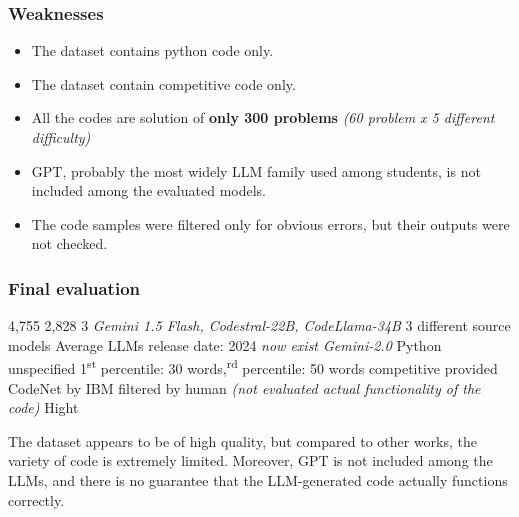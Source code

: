 \subsubsection*{Weaknesses}
\begin{itemize}
    \item The dataset contains python code only.
    \item The dataset contain competitive code only.
    \item All the codes are solution of \textbf{only 300 problems} 
    \textit{(60 problem x 5 different difficulty)}
    \item GPT, probably the most widely LLM family 
    used among students, is not 
    included among the evaluated models.
    \item The code samples were filtered only for obvious errors, 
    but their outputs were not checked.
\end{itemize}


\subsubsection*{Final evaluation}


\expandafter\def\csname AIGCodeSetHumanCode\endcsname{4,755}
\expandafter\def\csname AIGCodeSetLLMCode\endcsname{2,828}
\expandafter\def\csname AIGCodeSetNumLLMs\endcsname{3 \textit{Gemini 1.5 Flash, Codestral-22B, CodeLlama-34B}}
\expandafter\def\csname AIGCodeSetLLMDiversity\endcsname{3 different source models}
\expandafter\def\csname AIGCodeSetCurrentUse\endcsname{Average LLMs release date: 2024 \textit{now exist Gemini-2.0}}
\expandafter\def\csname AIGCodeSetLanguages\endcsname{Python}
\expandafter\def\csname AIGCodeSetCodeTypes\endcsname{unspecified}
\expandafter\def\csname AIGCodeSetCodeSize\endcsname{1\textsuperscript{st} percentile: 30 words,\textsuperscript{rd} percentile: 50 words}
\expandafter\def\csname AIGCodeSetCodeContext\endcsname{competitive}
\expandafter\def\csname AIGCodeSetPrompts\endcsname{provided}
\expandafter\def\csname AIGCodeSetSources\endcsname{CodeNet by IBM \cite{puri2021codenet}}
\expandafter\def\csname AIGCodeSetCodeQuality\endcsname{filtered by human \textit{(not evaluated
actual functionality of the code)}}
\expandafter\def\csname AIGCodeSetReliability\endcsname{Hight}




The dataset appears to be of high quality, but compared to other works, 
the variety of code is extremely limited.
Moreover, GPT is not included among the LLMs, and there is no guarantee that 
the LLM-generated code actually functions correctly.